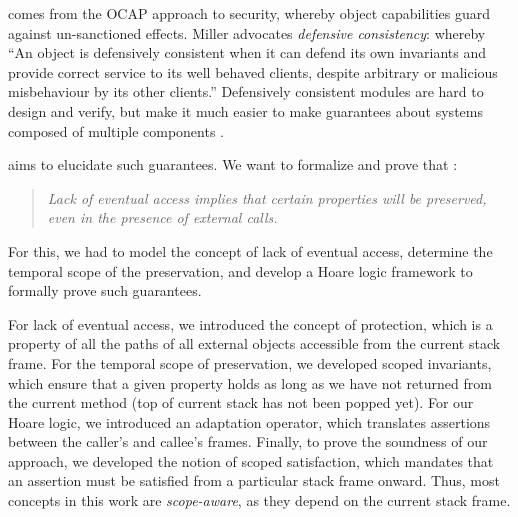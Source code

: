 
\newcommand{\paragraphSD}[1]{\vspace{.1cm}\noindent{\emph{#1}}}


\paragraphSD{Our motivation}
comes from the OCAP approach to security, whereby object capabilities guard against un-sanctioned effects.
Miller \cite{miller-esop2013,MillerPhD} advocates
 \emph{defensive consistency}: whereby %
 {``An object is defensively
  consistent when it can defend its own invariants and provide correct
  service to its well behaved clients, despite arbitrary or malicious
  misbehaviour by its other clients.''}  Defensively consistent
modules  are  hard to design %
 and  verify, but
make it much
easier to make guarantees about systems composed of multiple components
\cite{Murray10dphil}.

 \paragraphSD{Our Work} aims to elucidate such guarantees. We want to formalize and prove  that 
\cite{permissionAuthority}:
\begin{quote}
\emph{Lack of eventual access implies that certain properties will be preserved, even in the presence of external calls.}
\end{quote}
For this, we had  to  model the concept of  lack of eventual access,  determine the temporal scope of the preservation, and  develop a Hoare logic framework to formally prove such guarantees.

For lack of eventual access,  we introduced the concept of protection, which is a property of all  the paths of all external objects accessible from the current stack frame.
For the  temporal scope of preservation, we developed scoped invariants, which ensure that a given property holds as long as we have not returned from the current method (top of current stack has not been popped yet). 
 For our Hoare logic, we introduced an adaptation operator, which translates assertions between the caller’s and callee’s frames. 
 Finally, to prove the soundness of our approach, we developed the notion of scoped satisfaction,  which mandates that an assertion must be satisfied from a particular stack frame onward. 
 Thus, most concepts in this work are  \emph{scope-aware}, as they depend  on the current stack frame.
 
